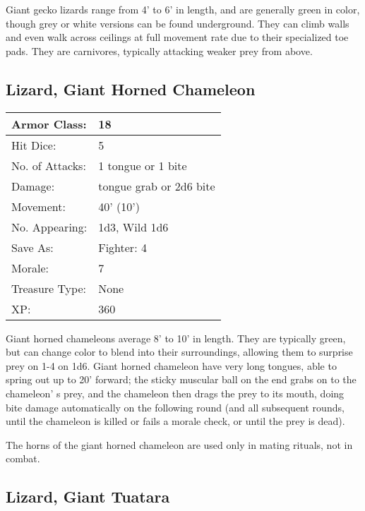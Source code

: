 \documentclass[a4paper,twoside,openany,10pt]{book}
\begin{document}
\begin{multicols}{2}
Giant gecko lizards range from 4' to 6' in length, and are generally green in color, though grey or white versions can be found underground. They can climb walls and even walk across ceilings at full movement rate due to their specialized toe pads. They are carnivores, typically attacking weaker prey from above.

\subsection*{Lizard, Giant Horned Chameleon}\label{lizard-giant-horned-chameleon}

\begin{tabularx}{0.50\textwidth}{@{}lX@{}}
Armor Class: & 18 \\\hline
Hit Dice: & 5 \\\hline
No. of Attacks: & 1 tongue or 1 bite \\\hline
Damage: & tongue grab or 2d6 bite \\\hline
Movement: & 40' (10') \\\hline
No. Appearing: & 1d3, Wild 1d6 \\\hline
Save As: & Fighter: 4 \\\hline
Morale: & 7 \\\hline
Treasure Type: & None \\\hline
XP: & 360 \\\hline
\end{tabularx}\medskip

Giant horned chameleons average 8' to 10' in length. They are typically green, but can change color to blend into their surroundings, allowing them to surprise prey on 1-4 on 1d6. Giant horned chameleon have very long tongues, able to spring out up to 20' forward; the sticky muscular ball on the end grabs on to the chameleon' s prey, and the chameleon then drags the prey to its mouth, doing bite damage automatically on the following round (and all subsequent rounds, until the chameleon is killed or fails a morale check, or until the prey is dead).

The horns of the giant horned chameleon are used only in mating rituals, not in combat.

\subsection*{Lizard, Giant Tuatara}\label{lizard-giant-tuatara}


\end{multicols}
\end{document}
